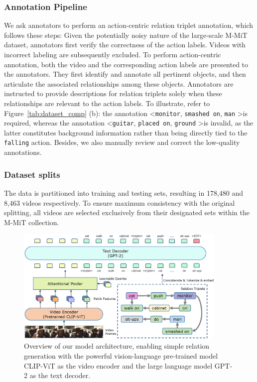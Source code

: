 \documentclass[letterpaper]{article}
\begin{document}
\subsubsection{Annotation Pipeline}
We ask annotators to perform an action-centric relation triplet annotation, which follows these steps:
Given the potentially noisy nature of the large-scale M-MiT dataset, annotators first verify the correctness of the action labels. Videos with incorrect labeling are subsequently excluded.
To perform action-centric annotation, both the video and the corresponding action labels are presented to the annotators. They first identify and annotate all pertinent objects, and then articulate the associated relationships among these objects.
Annotators are instructed to provide descriptions for relation triplets solely when these relationships are relevant to the action labels.
To illustrate, refer to Figure~\ref{tab:dataset_comp} (b): the annotation \textless \texttt{monitor}, \texttt{smashed on}, \texttt{man} \textgreater is required, whereas the annotation \textless \texttt{guitar}, \texttt{placed on}, \texttt{ground} \textgreater is invalid, as the latter constitutes background information rather than being directly tied to the \texttt{falling} action.
Besides, we also manually review and correct the low-quality annotations.

\subsubsection{Dataset splits}
The data is partitioned into training and testing sets, resulting in 178,480 and 8,463 videos respectively.
To ensure maximum consistency with the original splitting, all videos are selected exclusively from their designated sets within the M-MiT collection.
\begin{figure}[t]
  \centering
  \includegraphics[width=0.9\textwidth]{fig/model-.png}
  \caption{Overview of our model architecture, enabling simple relation generation with the powerful vision-language pre-trained model CLIP-ViT as the video encoder and the large language model GPT-2 as the text decoder.
  }
  \label{fig:arch}
\end{figure}
\end{document}

